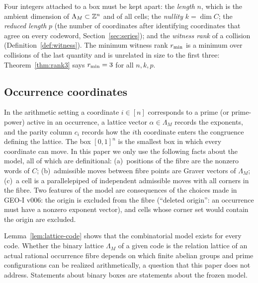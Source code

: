 \begin{remark}\label{rem:fournumbers}
Four integers attached to a box must be kept apart: the \emph{length} $n$, which is the ambient dimension of $\Lambda_M\subset\mathbb Z^n$ and of all cells; the \emph{nullity} $k=\dim C$; the \emph{reduced length} $p$ (the number of coordinates after identifying coordinates that agree on every codeword, Section~\ref{sec:series}); and the \emph{witness rank} of a collision (Definition~\ref{def:witness}). The minimum witness rank $r_{\min}$ is a minimum over collisions of the last quantity and is unrelated in size to the first three: Theorem~\ref{thm:rank3} says $r_{\min}=3$ for all $n,k,p$.
\end{remark}

\subsection{Occurrence coordinates}

In the arithmetic setting a coordinate $i\in[n]$ corresponds to a prime (or prime-power) active in an occurrence, a lattice vector $\alpha\in\Lambda_M$ records the exponents, and the parity column $c_i$ records how the $i$th coordinate enters the congruence defining the lattice. The box $[0,1]^n$ is the smallest box in which every coordinate can move. In this paper we only use the following facts about the model, all of which are definitional: (a)~positions of the fibre are the nonzero words of $C$; (b)~admissible moves between fibre points are Graver vectors of $\Lambda_M$; (c)~a cell is a parallelepiped of independent admissible moves with all corners in the fibre. Two features of the model are consequences of the choices made in GEO-I v006: the origin is excluded from the fibre (``deleted origin'': an occurrence must have a nonzero exponent vector), and cells whose corner set would contain the origin are excluded.

\begin{remark}\label{rem:realize}
Lemma~\ref{lem:lattice-code} shows that the combinatorial model exists for every code. Whether the binary lattice $\Lambda_M$ of a given code is the relation lattice of an actual rational occurrence fibre depends on which finite abelian groups and prime configurations can be realized arithmetically, a question that this paper does not address. Statements about binary boxes are statements about the frozen model.
\end{remark}

